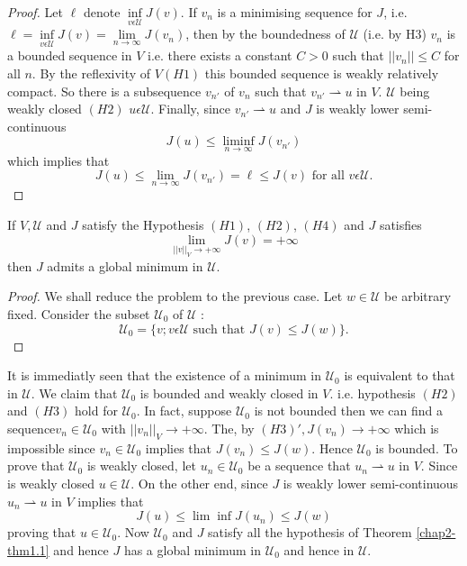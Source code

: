 \begin{proof}
Let $\ell$ denote $\inf\limits_{v \epsilon \mathcal{U}} J(v)$. If $v_{n}$ is a minimising sequence for $J$, i.e. $\ell = \inf\limits_{v \epsilon \mathcal{U}} J(v) = \lim\limits_{n \to \infty} J(v_{n})$, then by the boundedness of $\mathcal{U}$ (i.e. by H3) $v_{n}$ is a bounded sequence in $V$ i.e. there exists a constant $C > 0$ such that $||v_{n}|| \leq C$ for all $n$. By the reflexivity of $V(H1)$ this bounded sequence is weakly relatively compact. So there is a subsequence $v_{n'}$ of $v_{n}$ such that $v_{n'} \rightharpoonup u$ in $V$. $\mathcal{U}$ being weakly closed $(H2)$ $u \epsilon \mathcal{U}$. Finally, since $v_{n'} \rightharpoonup u$ and $J$ is weakly lower semi-continuous
$$
J(u) \leq \mathop{\lim \inf}_{n \to \infty} J(v_{n'})
$$
which implies that
$$
J(u) \leq \lim_{n \to \infty} J(v_{n'}) = \ell \leq J(v) \text{ for all } v \epsilon \mathcal{U}.
$$
\end{proof}

\begin{theorem}\label{chap2-thm1.2}
If $V, \mathcal{U}$ and $J$ satisfy the Hypothesis $(H1)$, $(H2)$, $(H4)$ and $J$ satisfies
\begin{equation*}
\lim_{||v||_{V} \to + \infty} J(v) = + \infty\tag*{$(H3)'$}\label{chap2-eqH3'}
\end{equation*}
then $J$ admits a global minimum in $\mathcal{U}$.
\end{theorem}

\begin{proof}
We shall reduce the problem to the previous case. Let $w \in \mathcal{U}$ be arbitrary fixed. Consider the subset $\mathcal{U}_{0}$ of $\mathcal{U}$ :
$$
\mathcal{U}_{0} = \{v ; v \epsilon \mathcal{U} \text{ such that } J(v) \leq J(w)\}.
$$
\end{proof}

It is immediatly seen that the existence of a minimum in $\mathcal{U}_{0}$ is equivalent to that in $\mathcal{U}$. We claim that $\mathcal{U}_{0}$ is bounded and weakly closed in $V.$ i.e. hypothesis $(H2)$ and $(H3)$ hold for $\mathcal{U}_{0}$. In fact, suppose $\mathcal{U}_{0}$ is not bounded then we can find a sequence\pageoriginale $v_{n} \in \mathcal{U}_{0}$ with $||v_{n}||_{V} \to + \infty$. The, by $(H3)' , J(v_{n}) \to + \infty$ which is impossible since $v_{n} \in \mathcal{U}_{0}$ implies that $J(v_{n}) \leq J(w)$. Hence $\mathcal{U}_{0}$ is bounded. To prove that $\mathcal{U}_{0}$ is weakly closed, let $u_{n} \in \mathcal{U}_{0}$ be a sequence that $u_{n} \rightharpoonup u$ in $V$. Since is weakly closed $u \in \mathcal{U}$. On the other end, since $J$ is weakly lower semi-continuous $u_{n} \rightharpoonup u$ in $V$ implies that
$$
J(u) \leq \lim \inf J(u_{n}) \leq J(w)
$$
proving that $u \in \mathcal{U}_{0}$. Now $\mathcal{U}_{0}$ and $J$ satisfy all the hypothesis of Theorem \ref{chap2-thm1.1} and hence $J$ has a global minimum in $\mathcal{U}_{0}$ and hence in $\mathcal{U}$.

